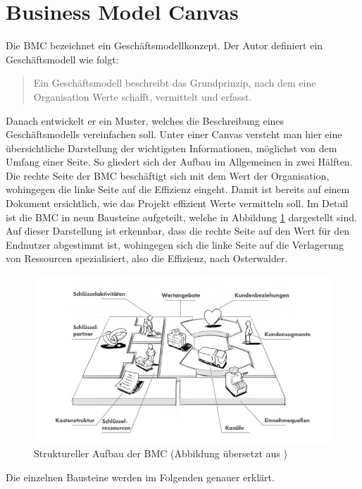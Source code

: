 \section{Business Model Canvas}
\label{BMC_Kapitel}
Die \ac{BMC} bezeichnet ein Geschäftsmodellkonzept. Der Autor definiert ein Geschäftsmodell wie folgt:
\begin{quote}
Ein Geschäftsmodell beschreibt das Grundprinzip, nach dem eine Organisation Werte schafft, vermittelt und erfasst.
\end{quote}
Danach entwickelt er ein Muster, welches die Beschreibung eines Geschäftsmodells vereinfachen soll. Unter einer Canvas versteht man hier eine übersichtliche Darstellung der wichtigsten Informationen, möglichst von dem Umfang einer Seite. So gliedert sich der Aufbau im Allgemeinen in zwei Hälften. Die rechte Seite der \ac{BMC} beschäftigt sich mit dem Wert der Organisation, wohingegen die linke Seite auf die Effizienz eingeht. Damit ist bereits auf einem Dokument ersichtlich, wie das Projekt effizient Werte vermitteln soll. Im Detail ist die \ac{BMC} in neun Bausteine aufgeteilt, welche in Abbildung \ref{fig:BMC_Structure} dargestellt sind. Auf dieser Darstellung ist erkennbar, dass die rechte Seite auf den Wert für den Endnutzer abgestimmt ist, wohingegen sich die linke Seite auf die Verlagerung von Ressourcen spezialisiert, also die Effizienz, nach Osterwalder. 
\begin{figure}
	\begin{center}
		\includegraphics[scale=0.5]{99_IMG/02_Grundlagen/bmcStructure.jpg}
		\caption[Struktureller Aufbau der \ac{BMC}]{Struktureller Aufbau der \ac{BMC} (Abbildung übersetzt aus )}
		\label{fig:BMC_Structure}
	\end{center}
\end{figure}
Die einzelnen Bausteine werden im Folgenden genauer erklärt.

